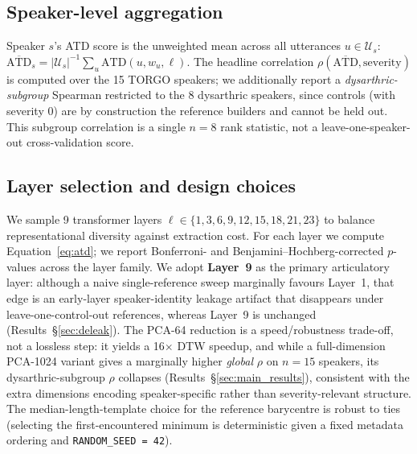 \subsection{Speaker-level aggregation}
Speaker $s$'s ATD score is the unweighted mean across all utterances
$u \in \mathcal{U}_s$:
\(\overline{\mathrm{ATD}}_s = |\mathcal{U}_s|^{-1} \sum_{u} \mathrm{ATD}(u, w_u, \ell)\).
The headline correlation $\rho(\overline{\mathrm{ATD}}, \mathrm{severity})$
is computed over the 15 TORGO speakers; we additionally report a
\emph{dysarthric-subgroup} Spearman restricted to the 8 dysarthric
speakers, since controls (with severity 0) are by construction the
reference builders and cannot be held out. This subgroup correlation is a
single $n = 8$ rank statistic, not a leave-one-speaker-out
cross-validation score.

\subsection{Layer selection and design choices}
We sample 9 transformer layers $\ell \in \{1, 3, 6, 9, 12, 15, 18, 21, 23\}$
to balance representational diversity against extraction cost. For each
layer we compute Equation~\ref{eq:atd}; we report Bonferroni- and
Benjamini--Hochberg-corrected $p$-values across the layer family. We adopt
\textbf{Layer~9} as the primary articulatory layer: although a naive
single-reference sweep marginally favours Layer~1, that edge is an
early-layer speaker-identity leakage artifact that disappears under
leave-one-control-out references, whereas Layer~9 is unchanged
(Results~\S\ref{sec:deleak}). The PCA-64 reduction is a speed/robustness
trade-off, not a lossless step: it yields a 16$\times$ DTW speedup, and
while a full-dimension PCA-1024 variant gives a marginally higher
\emph{global} $\rho$ on $n = 15$ speakers, its dysarthric-subgroup $\rho$
collapses (Results~\S\ref{sec:main_results}), consistent with the extra
dimensions encoding speaker-specific rather than severity-relevant
structure. The median-length-template choice for the reference barycentre
is robust to ties (selecting the first-encountered minimum is
deterministic given a fixed metadata ordering and
\texttt{RANDOM\_SEED = 42}).

